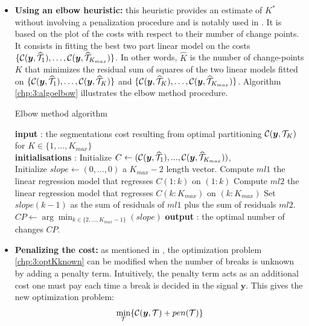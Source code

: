 \begin{itemize}
\item \textbf{Using an elbow heuristic:} this heuristic provides an estimate of $K^*$ without involving a penalization procedure and is notably used in \cite{lung2015}. It is based on the plot of the costs with respect to their number of change points. It consists in fitting the best two part linear model on the costs $\{{\mathcal C}(\bm y, \widehat{{\mathcal T}}_1),\dots,{\mathcal C}(\bm y, \widehat{{\mathcal T}}_{K_{max}})\}$. In other words, $\widehat{K}$ is the number of change-points $K$ that minimizes the residual sum of squares of the two linear models fitted on $\{{\mathcal C}(\bm y, \widehat{{\mathcal T}}_1),\dots,{\mathcal C}(\bm y, \widehat{{\mathcal T}}_{K})\}$ and $\{{\mathcal C}(\bm y, \widehat{{\mathcal T}}_K),\dots,{\mathcal C}(\bm y, \widehat{{\mathcal T}}_{K_{max}})\}$. Algorithm \ref{chp:3:algoelbow} illustrates the elbow method procedure.
\begin{algorithm}[ht]
\caption{Elbow method algorithm}\label{chp:3:algoelbow}
\begin{algorithmic}
\State \textbf{input} : the segmentations cost resulting from optimal partitioning ${\mathcal C}(\bm y, {\mathcal T}_{K})$ for $K \in \{1,...,K_{max}\}$ \\
\State \textbf{initialisations} : Initialize $C \gets ({\mathcal C}(\bm y, \widehat{{\mathcal T}}_{1}),...,{\mathcal C}(\bm y, \widehat{{\mathcal T}}_{K_{max}}))$, \\
Initialize $slope \gets (0,...,0)$  a $K_{max}-2$ length vector. 
  \State Compute $ml1$ the linear regression model that regresses $C(1:k)$ on $(1:k)$
  \State Compute $ml2$ the linear regression model that regresses $C(k:K_{max})$ on $(k:K_{max})$
  \State Set $slope(k-1)$ as the sum of residuals of $ml1$ plus the sum of residuals $ml2$.
\EndFor
\State $CP \gets \arg\min_{k\in\{2,...,K_{max}-1\}}(slope)$
\State \textbf{output} : the optimal number of changes $CP$. 
\end{algorithmic}
\end{algorithm} 
\item \textbf{Penalizing the cost:} as mentioned in \cite{truong2020}, the optimization problem \eqref{chp:3:optKknown} can be modified when the number of breaks is unknown by adding a penalty term. Intuitively, the penalty term acts as an additional cost one must pay each time a break is decided in the signal $\bm y$. This gives the new optimization problem: 
\begin{equation}\label{chp:3:optKnknown}
\min_{\TT} \{ \mathcal{C}(\bm y,\TT) + pen(\TT) \} 

\end{equation}
\end{itemize}
